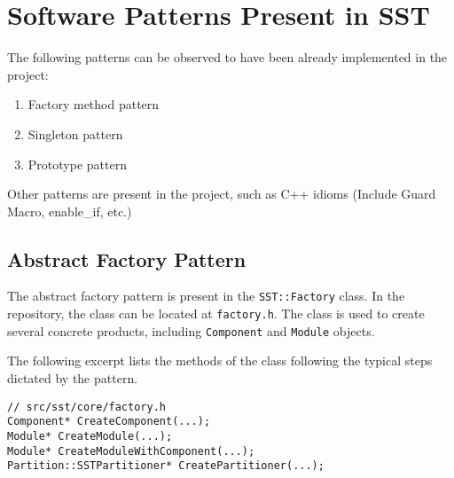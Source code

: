 
\section{Software Patterns Present in SST}
The following patterns can be observed to have been already implemented in the project:
\begin{enumerate}
    \item Factory method pattern
    \item Singleton pattern
    \item Prototype pattern
\end{enumerate}
Other patterns are present in the project, such as C++ idioms (Include Guard Macro, enable\_if, etc.)


\subsection{Abstract Factory Pattern}
The abstract factory pattern is present in the \texttt{SST::Factory} class. In the repository, the class can be located at \texttt{factory.h}. The class is used to create several concrete products, including \texttt{Component} and \texttt{Module} objects.

The following excerpt lists the methods of the class following the typical steps dictated by the pattern.

\begin{lstlisting}[style=customC++,label=fm,caption=Factory Implementing the Abstract Factory Pattern]
// src/sst/core/factory.h
Component* CreateComponent(...);
Module* CreateModule(...);
Module* CreateModuleWithComponent(...);
Partition::SSTPartitioner* CreatePartitioner(...);
\end{lstlisting}

